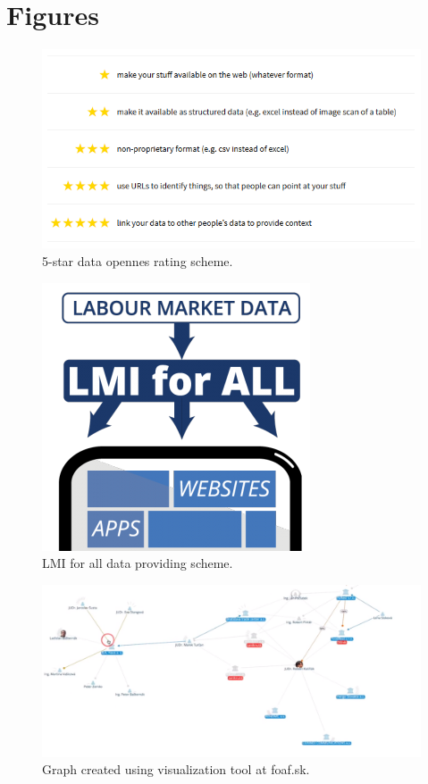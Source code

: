 \documentclass[thesis=B,english]{FITthesis}[2012/06/26]
\begin{document}
{\chapter{Figures}
\begin{figure}[H]
  \includegraphics[width=\linewidth]{pictures/5starRating.png}
  \caption{5-star data opennes rating scheme. \cite{5stardata}}
  \label{fig:5-star}
\end{figure}

\begin{figure}[H]
	\centering
	\includegraphics[scale=0.5]{pictures/LMIForAll.png}
  	\caption{LMI for all data providing scheme. \cite{lmiforall}}
  	\label{fig:LMI for all}
\end{figure}

\begin{figure}[H]
  \includegraphics[width=\linewidth]{pictures/foafskgraph.png}
  \caption{Graph created using visualization tool at foaf.sk.}
  \label{fig:foafGraph}
\end{figure}

}
\end{document}
